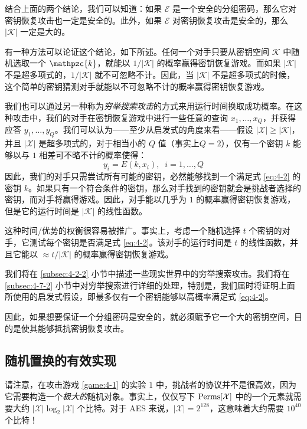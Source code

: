 结合上面的两个结论，我们可以知道：如果 $\mathcal{E}$ 是一个安全的分组密码，那么它对密钥恢复攻击也一定是安全的。此外，如果 $\mathcal{E}$ 对密钥恢复攻击是安全的，那么 $|\mathcal{K}|$ 一定是大的。

有一种方法可以论证这个结论，如下所述。任何一个对手只要从密钥空间 $\mathcal{K}$ 中随机选取一个 $\mathpzc{k}$，就能以 ${1}/{|\mathcal{K}|}$ 的概率赢得密钥恢复游戏。而如果 $|\mathcal{K}|$ 不是超多项式的，${1}/{|\mathcal{K}|}$ 就不可忽略不计。因此，当 $|\mathcal{K}|$ 不是超多项式的时候，这个简单的密钥猜测对手就能以不可忽略不计的概率赢得密钥恢复游戏。

我们也可以通过另一种称为\emph{穷举搜索攻击}的方式来用运行时间换取成功概率。在这种攻击中，我们的对手在密钥恢复游戏中进行一些任意的查询 $x_1,\dots,x_Q$，并获得应答 $y_1,\dots,y_Q$。我们可以认为——至少从启发式的角度来看——假设 $|\mathcal{X}|\geq|\mathcal{K}|$，并且 $|\mathcal{X}|$ 是超多项式的，对于相当小的 $Q$ 值（事实上$Q=2$），仅有一个密钥 $k$ 能够以与 $1$ 相差可不略不计的概率使得：
\begin{equation}\label{eq:4-2}
y_i=E(k,x_i),
\;\;
i=1,\dots,Q
\end{equation}
因此，我们的对手只需尝试所有可能的密钥，必然能够找到一个满足式 \ref{eq:4-2} 的密钥 $k$。如果只有一个符合条件的密钥，那么对手找到的密钥就会是挑战者选择的密钥，而对手将赢得游戏。因此，对手能以几乎为 $1$ 的概率赢得密钥恢复游戏，但是它的运行时间是 $|\mathcal{K}|$ 的线性函数。

这种时间/优势的权衡很容易被推广。事实上，考虑一个随机选择 $t$ 个密钥的对手，它测试每个密钥是否满足式 \ref{eq:4-2}。该对手的运行时间是 $t$ 的线性函数，并且它能以 $\approx{t}/{|\mathcal{K}|}$ 的概率赢得密钥恢复游戏。

我们将在 \ref{subsec:4-2-2} 小节中描述一些现实世界中的穷举搜索攻击。我们将在 \ref{subsec:4-7-2} 小节中对穷举搜索进行详细的处理，特别是，我们届时将证明上面所使用的启发式假设，即最多仅有一个密钥能够以高概率满足式 \ref{eq:4-2}。

因此，如果想要保证一个分组密码是安全的，就必须赋予它一个大的密钥空间，目的是使其能够抵抗密钥恢复攻击。

\subsection{随机置换的有效实现}\label{subsec:4-1-2}

请注意，在攻击游戏 \ref{game:4-1} 的实验 $1$ 中，挑战者的协议并不是很高效，因为它需要构造一个\emph{极大的}随机对象。事实上，仅仅写下 ${\rm Perms}[\mathcal{X}]$ 中的一个元素就需要大约 $|\mathcal{X}|\log_2|\mathcal{X}|$ 个比特。对于 AES 来说，$|\mathcal{X}|=2^{128}$，这意味着大约需要 $10^{40}$ 个比特！

